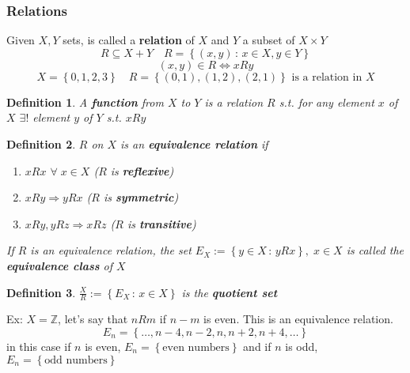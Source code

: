 \documentclass[a4paper,12pt]{article}
\theoremstyle{break}
\newtheorem{definition}{Definition}[section]
\numberwithin{equation}{section}
\begin{document}
    \subsubsection*{Relations}
    Given \(X, Y\) sets, is called a \textbf{relation} of \(X\) and \(Y\) a subset of \(X \times Y\)
    \[
        R \subseteq X + Y \quad R = \left\lbrace (x,y) \, : \, x \in X, y \in Y \right\rbrace
    \]
    \[
        (x,y) \in R \Longleftrightarrow xRy
    \]
    \[
        X = \left\lbrace 0,1,2,3 \right\rbrace \quad R = \left\lbrace (0,1), (1,2), (2,1) \right\rbrace \mbox{ is a relation in } X
    \]
\begin{definition}
    A \textbf{function} from \(X\) to \(Y\) is a relation \(R\) s.t. for any element \(x\) of \(X\) \(\exists !\) element \(y\) of \(Y\) s.t. \(xRy\)
\end{definition}
\begin{definition}
    \(R\) on \(X\) is an \textbf{equivalence relation} if 
    \begin{enumerate}
        \item \(xRx\) \(\forall \; x \in X\) (\(R\) is \textbf{reflexive})
        \item \(xRy \Longrightarrow yRx\) (\(R\) is \textbf{symmetric})
        \item \(xRy, yRz \Longrightarrow xRz\) (\(R\) is \textbf{transitive})
    \end{enumerate}
    If \(R\) is an equivalence relation, the set 
    \(
        E_X := \left\lbrace y \in X \, : \, yRx \right\rbrace, \; x \in X
    \)
    is called the \textbf{equivalence class} of \(X\)
\end{definition}
\begin{definition}
    \(\frac{X}{R} := \left\lbrace E_X \, : \, x \in X \right\rbrace\) is the \textbf{quotient set}
\end{definition}
Ex: \(X = \mathbb{Z}\), let's say that \(nRm\) if \(n-m\) is even. This is an equivalence relation.
\[
    E_n = \left\lbrace \ldots, n-4, n-2, n, n+2, n+4, \ldots \right\rbrace
\]
in this case if \(n\) is even, \(E_n = \left\lbrace \mbox{even numbers} \right\rbrace\) and if \(n\) is odd, \(E_n = \left\lbrace \mbox{odd numbers} \right\rbrace\)
\end{document}
